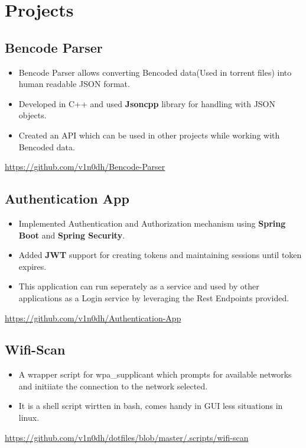 \documentclass[10pt,a5paper]{article}
\begin{document}
\section{Projects}
\subsection{Bencode Parser}
\begin{itemize}[leftmargin=6mm]
	\setlength\itemsep{0em}
	\item{Bencode Parser allows converting Bencoded data(Used in torrent files) into human readable JSON format.}
	\item{Developed in C++ and used \textbf{Jsoncpp} library for handling with JSON objects.}
	\item{Created an API which can be used in other projects while working with Bencoded data.}
\end{itemize}
\vspace*{-0.5em}
\url{https://github.com/v1n0dh/Bencode-Parser}

\subsection{Authentication App}
\begin{itemize}[leftmargin=6mm]
	\setlength\itemsep{0em}
	\item{Implemented Authentication and Authorization mechanism using \textbf{Spring Boot} and \textbf{Spring Security}.}
	\item{Added \textbf{JWT} support for creating tokens and maintaining sessions until token expires.}
	\item{This application can run seperately as a service and used by other applications as a Login service by leveraging the Rest Endpoints provided.}
\end{itemize}
\vspace*{-0.5em}
\url{https://github.com/v1n0dh/Authentication-App}

\subsection{Wifi-Scan}
\begin{itemize}[leftmargin=6mm]
	\setlength\itemsep{0em}
	\item{A wrapper script for wpa\_supplicant which prompts for available networks and initiiate the connection to the network selected.}
	\item{It is a shell script wirtten in bash, comes handy in GUI less situations in linux.}
\end{itemize}
\vspace*{-0.5em}
\url{https://github.com/v1n0dh/dotfiles/blob/master/.scripts/wifi-scan}
\end{document}
